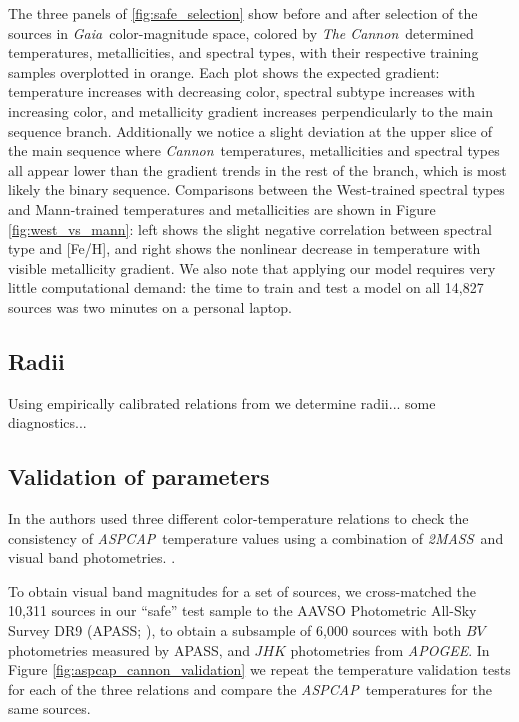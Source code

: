 \documentclass[modern]{aastex62}
\newcommand{\apogee}{\textsl{APOGEE}}
\newcommand{\thecannon}{\textsl{The Cannon}}
\newcommand{\cannon}{\textsl{Cannon}}
\newcommand{\aspcap}{\textsl{ASPCAP}}
\newcommand{\gaia}{\textsl{Gaia}}
\newcommand{\zmass}{\textsl{2MASS}}
\begin{document}
The three panels of \ref{fig:safe_selection} show before and after selection of the sources in \gaia\ color-magnitude space, colored by \thecannon\ determined temperatures, metallicities, and spectral types, with their respective training samples overplotted in orange. Each plot shows the expected gradient: temperature increases with decreasing color, spectral subtype increases with increasing color, and metallicity gradient increases perpendicularly to the main sequence branch. Additionally we notice a slight deviation at the upper slice of the main sequence where \cannon\ temperatures, metallicities and spectral types all appear lower than the gradient trends in the rest of the branch, which is most likely the binary sequence. Comparisons between the West-trained spectral types and Mann-trained temperatures and metallicities are shown in Figure \ref{fig:west_vs_mann}: left shows the slight negative correlation between spectral type and [Fe/H], and right shows the nonlinear decrease in temperature with visible metallicity gradient. We also note that applying our model requires very little computational demand: the time to train and test a model on all 14,827 sources was two minutes on a personal laptop. 


\subsection{Radii}
Using empirically calibrated relations from \citealt{Mann:2015} we determine radii... some diagnostics...


\subsection{Validation of parameters}

In \citealt{Schmidt:2016} the authors used three different color-temperature relations to check the consistency of \aspcap\ temperature values using a combination of \zmass\ and visual band photometries. \color{black}. 

To obtain visual band magnitudes for a set of sources, we cross-matched the 10,311 sources in our ``safe'' test sample to the AAVSO Photometric All-Sky Survey DR9 (APASS; \citealt{Henden:2016}), to obtain a subsample of 6,000 sources with both $BV$ photometries measured by APASS, and $JHK$ photometries from \apogee. In Figure \ref{fig:aspcap_cannon_validation} we repeat the temperature validation tests for each of the three relations and compare the \aspcap\ temperatures for the same sources. \color{gcolor}{Comments about validation results and the uncertainty of our Cannon temperatures...}\color{black}
\end{document}
